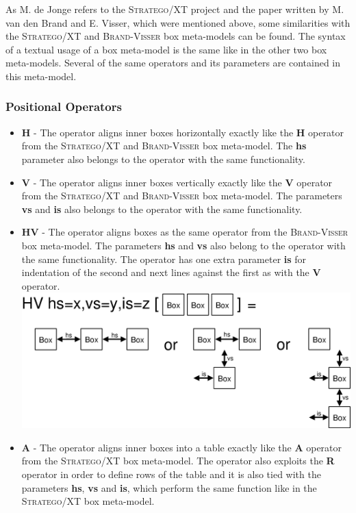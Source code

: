 \documentclass[12pt,notitlepage,a4paper]{report}
\begin{document}
As M. de Jonge refers to the \textsc{Stratego/XT} project and the paper written by M. van den Brand and E. Visser, which were mentioned above, some similarities with the \textsc{Stratego/XT} and \textsc{Brand-Visser} box meta-models can be found. The syntax of a textual usage of a box meta-model is the same like in the other two box meta-models. Several of the same operators and its parameters are contained in this meta-model. 
\vspace{0.5cm}

\subsubsection{Positional Operators}
\begin{itemize}
\item \textbf{H} - The operator aligns inner boxes horizontally exactly like the \textbf{H} operator from the \textsc{Stratego/XT} and \textsc{Brand-Visser} box meta-model.  The \textbf{hs} parameter also belongs to the operator with the same functionality.
\item \textbf{V} - The operator aligns inner boxes vertically exactly like the \textbf{V} operator from the \textsc{Stratego/XT} and \textsc{Brand-Visser} box meta-model.  The parameters \textbf{vs} and \textbf{is} also belongs to the operator with the same functionality.
\item \textbf{HV} -  The operator aligns boxes as the same operator from the \textsc{Brand-Visser} box meta-model. The parameters \textbf{hs} and \textbf{vs} also belong to the operator with the same functionality. The operator has one extra parameter \textbf{is} for indentation of the second and next lines against the first as with the \textbf{V} operator.
\includegraphics[scale=0.4]{pictures/DeJonge-HV.eps}
\item \textbf{A} - The operator aligns inner boxes into a table exactly like the \textbf{A} operator from the \textsc{Stratego/XT} box meta-model. The operator also exploits the \textbf{R} operator in order to define rows of the table and it is also tied with the parameters \textbf{hs}, \textbf{vs} and \textbf{is}, which perform the same function like in the \textsc{Stratego/XT} box meta-model.

\end{itemize}
\end{document}

